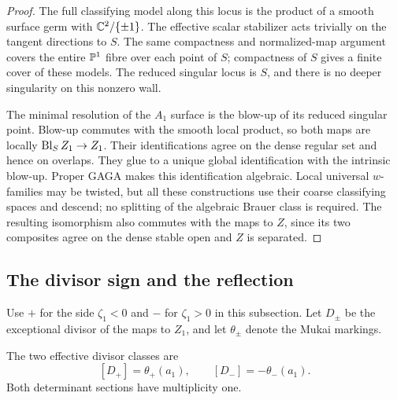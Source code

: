 \begin{proof}
The full classifying model along this locus is the product of a
smooth surface germ with $\mathbb C^2/\{\pm1\}$. The effective scalar
stabilizer acts trivially on the tangent directions to $S$. The
same compactness and normalized-map argument covers the entire
$\mathbb P^1$ fibre over each point of $S$; compactness of $S$ gives a
finite cover of these models. The reduced singular locus is $S$,
and there is no deeper singularity on this nonzero wall.

The minimal resolution of the $A_1$ surface is the blow-up of
its reduced singular point. Blow-up commutes with the smooth
local product, so both maps are locally $\operatorname{Bl}_S Z_1\to Z_1$.
Their identifications agree on the dense regular set and hence
on overlaps. They glue to a unique global identification with
the intrinsic blow-up. Proper GAGA makes this identification
algebraic. Local universal $w$-families may be twisted, but all
these constructions use their coarse classifying spaces and
descend; no splitting of the algebraic Brauer class is required.
The resulting isomorphism also commutes with the maps to $Z$,
since its two composites agree on the dense stable open and $Z$
is separated.
\end{proof}

\subsection{The divisor sign and the reflection}
Use $+$ for the side $\zeta_1<0$ and $-$ for $\zeta_1>0$ in this
subsection. Let $D_\pm$ be the exceptional divisor of the maps
to $Z_1$, and let $\theta_\pm$ denote the Mukai markings.

\begin{lemma}\label{lem:opposite-divisors}
The two effective divisor classes are
\[
 [D_+]=\theta_+(a_1),\qquad [D_-]=-\theta_-(a_1).
\]
Both determinant sections have multiplicity one.
\end{lemma}

